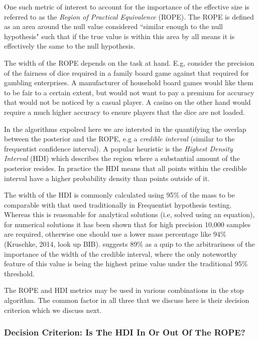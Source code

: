 \documentclass{article}
\begin{document}
One such metric of interest to account for the importance of the effective size
is referred to as the
\textit{Region of Practical Equivalence} (ROPE).
The ROPE is defined as an area around the null value considered “similar enough 
to the null hypothesis" such that if the true value is within this area by all
means it is effectively the same to the null hypothesis.

The width of the ROPE depends on the task at hand.
E.g, consider the precision of the fairness of dice required in a family board game
against that required for gambling enterprises.
A manufacturer of household board games would like them to be fair to a certain extent,
but would not want to pay a premium for accuracy that would not be noticed by a casual
player. A casino on the other hand would require a much higher accuracy to ensure
players that the dice are not loaded.

In the algorithms expolred here we are intersted in the quantifying the overlap
between the posterior and the ROPE, e.g a \textit{credible interval} (similar to the frequentist confidence interval).
A popular heuristic is the \textit{Highest Density Interval} (HDI)
which describes the region where a substantial amount of the posterior resides.
In practice the HDI means that all points within the credible interval have a higher
probability density than points outside of it.

The width of the HDI is commonly calculated using 95\% of the mass to be comparable
with that used traditionally in Frequentist hypothesis testing.
Whereas this is reasonable for analytical solutions (i.e, solved using an equation),
for numerical solutions it has been shown that for high precision 10,000 samples are
required, otherwise one should use a lower mass percentage like 94\% (Kruschke, 2014, look up BIB).
\cite{mcelreath2016} suggests 89\% as a quip to the arbitrariness of the importance of the
width of the credible interval, where the only noteworthy feature of this value is being
the highest prime value under the traditional 95\% threshold.  

The ROPE and HDI metrics may be used in various combinations in the stop algorithm.
The common factor in all three that we discuss here is their decision criterion
which we discuss next.


\subsubsection{Decision Criterion: Is The HDI In Or Out Of The ROPE?}
\end{document}

